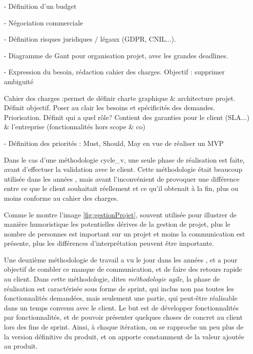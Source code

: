 

- Définition d'un budget

- Négociation commerciale

- Définition risques juridiques / légaux (GDPR, CNIL...).

- Diagramme de Gant pour organisation projet, avec les grandes deadlines.

- Expression du besoin, rédaction cahier des charges. Objectif : supprimer ambiguité

Cahier des charges :permet de définir charte graphique \& architecture projet. Définit objectif. Poser au clair les besoins et spécificités des demandes. Priorisation. Définit qui a quel rôle? Contient des garanties pour le client (SLA...) \& l'entreprise (fonctionnalités hors scope \& co)

- Définition des priorités : Must, Should, May en vue de réaliser un MVP

Dans le cas d'une méthodologie \gls{cycle_v}, une seule phase de réalisation est faite, avant d'effectuer la validation avec le client. Cette méthodologie était beaucoup utilisée dans les années , mais avant l'inconvénient de provoquer une différence entre ce que le client souhaitait réellement et ce qu'il obtenait à la fin, plus ou moins conforme au cahier des charges. 


Comme le montre l'image \ref{fig:gestionProjet}, souvent utilisée pour illustrer de manière humoristique les potentielles dérives de la gestion de projet, plus le nombre de personnes est important sur un projet et moins la communication est présente, plus les différences d'interprétation peuvent être importante. 

Une deuxième méthodologie de travail a vu le jour dans les années , et a pour objectif de combler ce manque de communication, et de faire des retours rapide au client. Dans cette méthodologie, dites \emph{méthodologie agile}, la phase de réalisation est caractérisée sous forme de sprint, qui inclus non pas toutes les fonctionnalités demandées, mais seulement une partie, qui peut-être réalisable dans un temps convenu avec le client. Le but est de développer fonctionnalités par fonctionnalités, et de pouvoir présenter quelques choses de concret au client lors des fins de sprint. Ainsi, à chaque itération, on se rapproche un peu plus de la version définitive du produit, et on apporte constamment de la valeur ajoutée au produit.

